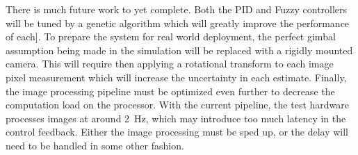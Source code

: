 \documentclass[]{aiaa-tc}
\begin{document}
There is much future work to yet complete. Both the PID and Fuzzy controllers will be tuned by a genetic algorithm which will greatly improve the performance of each]. To prepare the system for real world deployment, the perfect gimbal assumption being made in the simulation will be replaced with a rigidly mounted camera. This will require then applying a rotational transform to each image pixel measurement which will increase the uncertainty in each estimate. Finally, the image processing pipeline must be optimized even further to decrease the computation load on the processor. With the current pipeline, the test hardware processes images at around \SI{2}{\Hz}, which may introduce too much latency in the control feedback. Either the image processing must be sped up, or the delay will need to be handled in some other fashion.
%
%
\end{document}
